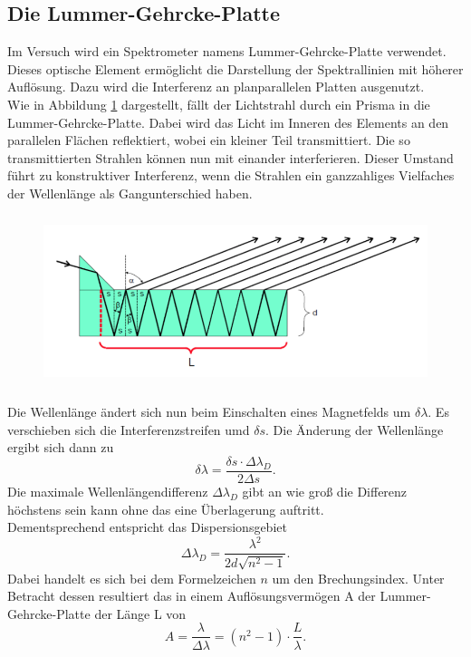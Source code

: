 \subsection{Die Lummer-Gehrcke-Platte}
Im Versuch wird ein Spektrometer namens Lummer-Gehrcke-Platte verwendet. Dieses optische Element ermöglicht die Darstellung der Spektrallinien mit höherer Auflösung. Dazu wird die Interferenz an planparallelen Platten ausgenutzt.\\
Wie in Abbildung \ref{Fig:Lummer} dargestellt, fällt der Lichtstrahl durch ein Prisma in die Lummer-Gehrcke-Platte. Dabei wird das Licht im Inneren des Elements an den parallelen Flächen reflektiert, wobei ein kleiner Teil transmittiert. Die so transmittierten Strahlen können nun mit einander interferieren. Dieser Umstand führt zu konstruktiver Interferenz, wenn die Strahlen ein ganzzahliges Vielfaches der Wellenlänge als Gangunterschied haben.\\
\begin{figure}[H]
    \centering
    \captionsetup{justification=centering}
    \includegraphics[height=5cm]{"Lummer_Platte.png"}
    \label{Fig:Lummer}
\end{figure}
Die Wellenlänge ändert sich nun beim Einschalten eines Magnetfelds um $\delta\lambda$. Es verschieben sich die Interferenzstreifen umd $\delta s$. Die Änderung der Wellenlänge ergibt sich dann zu 
\begin{equation}
    \delta\lambda=\frac{\delta s\cdot\Delta\lambda_D}{2\Delta s}.
\end{equation}
Die maximale Wellenlängendifferenz $\Delta\lambda_D$ gibt an wie groß die Differenz höchstens sein kann ohne das eine Überlagerung auftritt.\\
Dementsprechend entspricht das Dispersionsgebiet 
\begin{equation}
    \Delta\lambda_D=\frac{\lambda^2}{2d\sqrt{n^2-1}}.
\end{equation}
Dabei handelt es sich bei dem Formelzeichen $n$ um den Brechungsindex. Unter Betracht dessen resultiert das in einem Auflösungsvermögen A der Lummer-Gehrcke-Platte der Länge L von 
\begin{equation}
    A=\frac{\lambda}{\Delta\lambda}=(n^2-1)\cdot\frac{L}{\lambda}.
\end{equation}
